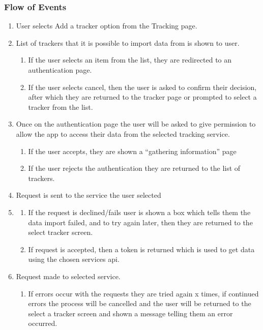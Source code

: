 \documentclass[a4paper,11pt]{article} %
\begin{document}
\subsubsection*{Flow of Events}
\begin{enumerate}
    \item User selects Add a tracker option from the Tracking page.
    \item List of trackers that it is possible to import data from is shown to user.
    \begin{enumerate}
        \item If the user selects an item from the list, they are redirected to an authentication page.
        \item If the user selects cancel, then the user is asked to confirm their decision, after which they are returned to the tracker page or prompted to select a tracker from the list.
    \end{enumerate}
    \item Once on the authentication page the user will be asked to give permission to allow the app to access their data from the selected tracking service.
    \begin{enumerate}
        \item If the user accepts, they are shown a “gathering information” page
        \item If the user rejects the authentication they are returned to the list of trackers.
    \end{enumerate}
    \item Request is sent to the service the user selected
    \item \begin{enumerate}
        \item If the request is declined/fails user is shown a box which tells them the data import failed, and to try again later, then they are returned to the select tracker screen.
        \item If request is accepted, then a token is returned which is used to get data using the chosen services api.
    \end{enumerate}
    \item Request made to selected service.
    \begin{enumerate}
        \item If errors occur with the requests they are tried again x times, if continued errors the process will be cancelled and the user will be returned to the select a tracker screen and shown a message telling them an error occurred.

\end{enumerate}
\end{enumerate}
\end{document}
